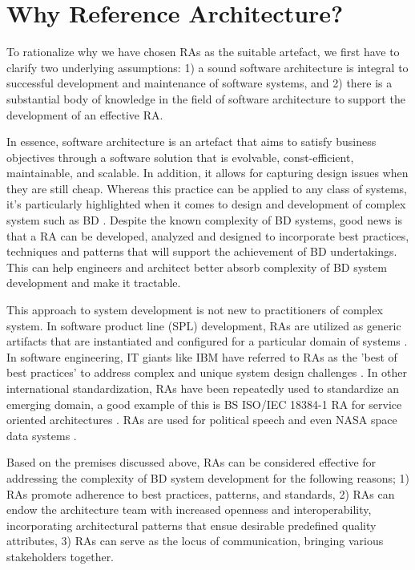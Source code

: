 \documentclass[runningheads]{llncs}
\begin{document}
\section{Why Reference Architecture?}
To rationalize why we have chosen RAs as the suitable artefact, we first have to clarify two underlying assumptions: 1) a sound software architecture is integral to successful development and maintenance of software systems, and 2) there is a substantial body of knowledge in the field of software architecture to support the development of an effective RA.

In essence, software architecture is an artefact that aims to satisfy business objectives through a software solution that is evolvable, const-efficient, maintainable, and scalable. In addition, it allows for capturing design issues when they are still cheap. Whereas this practice can be applied to any class of systems, it's particularly highlighted when it comes to design and development of complex system such as BD \cite{ataei2021neomycelia}. Despite the known complexity of BD systems, good news is that a RA can be developed, analyzed and designed to incorporate best practices, techniques and patterns that will support the achievement of BD undertakings. This can help engineers and architect better absorb complexity of BD system development and make it tractable. 

This approach to system development is not new to practitioners of complex system. In software product line (SPL) development, RAs are utilized as generic artifacts that are instantiated and configured for a particular domain of systems \cite{Derras}. In software engineering, IT giants like IBM have referred to RAs as the 'best of best practices' to address complex and unique system design challenges \cite{Cloutier}. In other international standardization, RAs have been repeatedly used to standardize an emerging domain, a good example of this is BS ISO/IEC 18384-1 RA for service oriented architectures \cite{Iso18384-1}. RAs are used for political speech and even NASA space data systems \cite{NASA}.

Based on the premises discussed above, RAs can be considered effective for addressing the complexity of BD system development for the following reasons; 1) RAs promote adherence to best practices, patterns, and standards, 2) RAs can endow the architecture team with increased openness and interoperability, incorporating architectural patterns that ensue desirable predefined quality attributes, 3) RAs can serve as the locus of communication, bringing various stakeholders together. 
\end{document}
